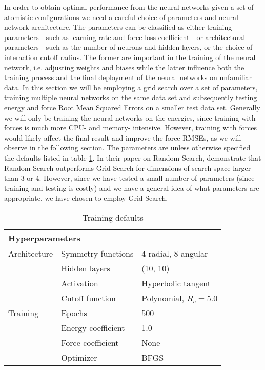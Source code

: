 In order to obtain optimal performance from the neural networks
given a set of atomistic configurations we need a careful choice of parameters
and neural network architecture. The parameters can be classified as either
training parameters - such as learning rate and force loss coefficient -
or architectural parameters - such as the number of neurons and hidden layers,
or the choice of interaction cutoff radius. The former are important
in the training of the neural network, i.e. adjusting weights and biases
while the latter influence both the training process and the final
deployment of the neural networks on unfamiliar data.
In this section we will be employing a grid search over a set of
parameters, training multiple neural networks on the same data set
and subsequently testing energy and force Root Mean Squared Errors on
a smaller test data set. Generally we will only be training the neural networks
on the energies, since training with forces is much more CPU- and memory-
intensive. However, training with forces would likely affect the final
result and improve the force RMSEs, as we will observe in the following section.
The parameters are unless otherwise specified the defaults listed
in table \ref{table:defaults}.
In their paper on Random Search, \parencite[Bergstra and Bengio]{
    bergstra2012random}
demonstrate that Random Search outperforms Grid Search for dimensions
of search space larger than 3 or 4. However, since we have tested
a small number of parameters (since training and testing is costly)
and we have a general idea of what parameters are appropriate, we
have chosen to employ Grid Search.

\begin{table}[h]
\begin{tabular}{@{}lll@{}}
\toprule
\multicolumn{3}{l}{Hyperparameters}                                    \\ \midrule
Architecture & Symmetry functions & 4 radial, 8 angular                \\
             & Hidden layers      & (10, 10)                           \\
             & Activation         & Hyperbolic tangent                 \\
             & Cutoff function    & Polynomial, $R_c = 5.0$            \\
Training     & Epochs             & 500                               \\
             & Energy coefficient & 1.0                                \\
             & Force coefficient  & None                                \\
             & Optimizer          & BFGS                               \\ \bottomrule
\end{tabular}
\caption{Training defaults}
\label{table:defaults}
\end{table}

